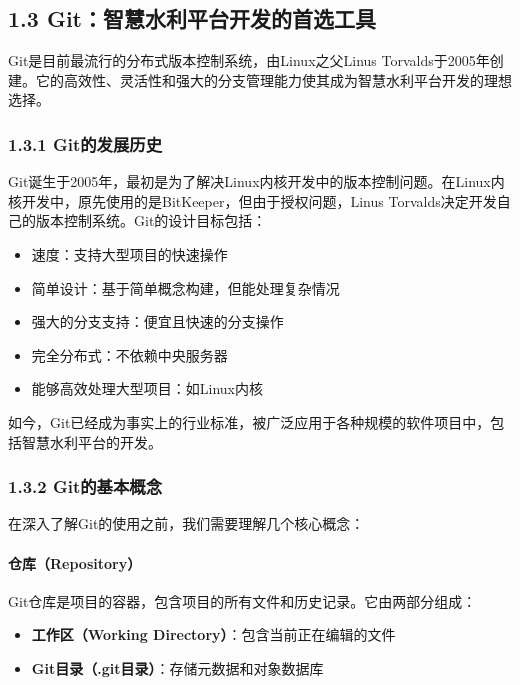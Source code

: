 \subsection{1.3
Git：智慧水利平台开发的首选工具}\label{gitux667aux6167ux6c34ux5229ux5e73ux53f0ux5f00ux53d1ux7684ux9996ux9009ux5de5ux5177}

Git是目前最流行的分布式版本控制系统，由Linux之父Linus
Torvalds于2005年创建。它的高效性、灵活性和强大的分支管理能力使其成为智慧水利平台开发的理想选择。

\subsubsection{1.3.1
Git的发展历史}\label{gitux7684ux53d1ux5c55ux5386ux53f2}

Git诞生于2005年，最初是为了解决Linux内核开发中的版本控制问题。在Linux内核开发中，原先使用的是BitKeeper，但由于授权问题，Linus
Torvalds决定开发自己的版本控制系统。Git的设计目标包括：

\begin{itemize}
\tightlist
\item
  速度：支持大型项目的快速操作
\item
  简单设计：基于简单概念构建，但能处理复杂情况
\item
  强大的分支支持：便宜且快速的分支操作
\item
  完全分布式：不依赖中央服务器
\item
  能够高效处理大型项目：如Linux内核
\end{itemize}

如今，Git已经成为事实上的行业标准，被广泛应用于各种规模的软件项目中，包括智慧水利平台的开发。

\subsubsection{1.3.2
Git的基本概念}\label{gitux7684ux57faux672cux6982ux5ff5}

在深入了解Git的使用之前，我们需要理解几个核心概念：

\paragraph{仓库（Repository）}\label{ux4ed3ux5e93repository}

Git仓库是项目的容器，包含项目的所有文件和历史记录。它由两部分组成：

\begin{itemize}
\tightlist
\item
  \textbf{工作区（Working Directory）}：包含当前正在编辑的文件
\item
  \textbf{Git目录（.git目录）}：存储元数据和对象数据库
\end{itemize}

